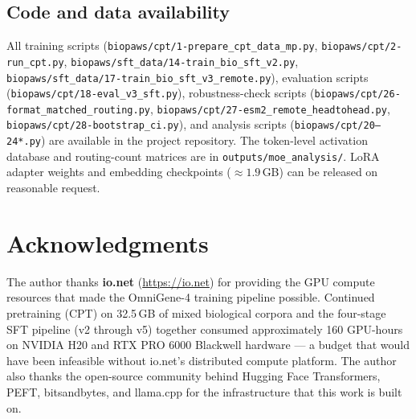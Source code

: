 \documentclass[11pt]{article}
\begin{document}
\subsection*{Code and data availability}

All training scripts (\texttt{biopaws/cpt/1-prepare\_cpt\_data\_mp.py}, \texttt{biopaws/cpt/2-run\_cpt.py}, \texttt{biopaws/sft\_data/14-train\_bio\_sft\_v2.py}, \texttt{biopaws/sft\_data/17-train\_bio\_sft\_v3\_remote.py}), evaluation scripts (\texttt{biopaws/cpt/18-eval\_v3\_sft.py}), robustness-check scripts (\texttt{biopaws/cpt/26-format\_matched\_routing.py}, \texttt{biopaws/cpt/27-esm2\_remote\_headtohead.py}, \texttt{biopaws/cpt/28-bootstrap\_ci.py}), and analysis scripts (\texttt{biopaws/cpt/20--24*.py}) are available in the project repository. The token-level activation database and routing-count matrices are in \texttt{outputs/moe\_analysis/}. LoRA adapter weights and embedding checkpoints ($\approx 1.9$\,GB) can be released on reasonable request.

\section*{Acknowledgments}

The author thanks \textbf{io.net} (\url{https://io.net}) for providing the GPU compute resources that made the OmniGene-4 training pipeline possible. Continued pretraining (CPT) on 32.5\,GB of mixed biological corpora and the four-stage SFT pipeline (v2 through v5) together consumed approximately 160 GPU-hours on NVIDIA H20 and RTX PRO 6000 Blackwell hardware --- a budget that would have been infeasible without io.net's distributed compute platform. The author also thanks the open-source community behind Hugging Face Transformers, PEFT, bitsandbytes, and llama.cpp for the infrastructure that this work is built on.



\end{document}
